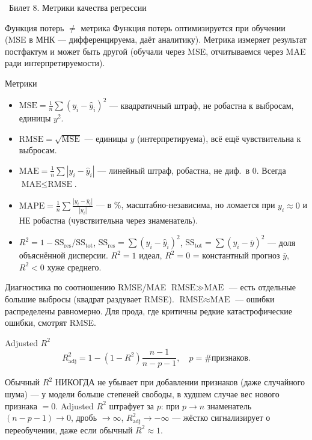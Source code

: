 \documentclass[12pt, a4paper]{article}
\newcommand{\bilet}[2]{%
  \vspace{10pt}%
  \noindent\colorbox{qcolor}{\parbox{\dimexpr\linewidth-2\fboxsep\relax}{%
    \color{white}\large\bfseries\strut\ Билет #1. #2%
  }}%
  \nopagebreak\vspace{5pt}\par\nopagebreak%
}
\newcommand{\wh}[1]{\widehat{#1}}
\begin{document}
\bilet{8}{Метрики качества регрессии}

\begin{rembox}{Функция потерь $\ne$ метрика}
Функция потерь оптимизируется при обучении (MSE в МНК --- дифференцируема, даёт аналитику). Метрика измеряет результат постфактум и может быть другой (обучали через MSE, отчитываемся через MAE ради интерпретируемости).
\end{rembox}

\begin{defbox}{Метрики}
\begin{itemize}
  \item $\text{MSE} = \frac1n\sum(y_i - \wh y_i)^2$ --- квадратичный штраф, не робастна к выбросам, единицы $y^2$.
  \item $\text{RMSE} = \sqrt{\text{MSE}}$ --- единицы $y$ (интерпретируема), всё ещё чувствительна к выбросам.
  \item $\text{MAE} = \frac1n\sum|y_i - \wh y_i|$ --- линейный штраф, робастна, не диф.\ в 0. Всегда $\text{MAE} \le \text{RMSE}$.
  \item $\text{MAPE} = \frac1n\sum \frac{|y_i - \wh y_i|}{|y_i|}$ --- в \%, масштабно-независима, но ломается при $y_i \approx 0$ и НЕ робастна (чувствительна через знаменатель).
  \item $R^2 = 1 - \text{SS}_{\text{res}}/\text{SS}_{\text{tot}}$, $\text{SS}_{\text{res}} = \sum(y_i-\wh y_i)^2$, $\text{SS}_{\text{tot}} = \sum(y_i - \bar y)^2$ --- доля объяснённой дисперсии. $R^2 = 1$ идеал, $R^2 = 0$ = константный прогноз $\bar y$, $R^2 < 0$ хуже среднего.
\end{itemize}
\end{defbox}

\begin{propbox}{Диагностика по соотношению RMSE/MAE}
$\text{RMSE} \gg \text{MAE}$ --- есть отдельные большие выбросы (квадрат раздувает RMSE). $\text{RMSE} \approx \text{MAE}$ --- ошибки распределены равномерно. Для прода, где критичны редкие катастрофические ошибки, смотрят RMSE.
\end{propbox}

\begin{defbox}{Adjusted $R^2$}
\[
  R^2_{\text{adj}} = 1 - (1 - R^2)\frac{n-1}{n-p-1}, \quad p = \text{\# признаков}.
\]
\end{defbox}

\begin{fishkabox}
Обычный $R^2$ НИКОГДА не убывает при добавлении признаков (даже случайного шума) --- у модели больше степеней свободы, в худшем случае вес нового признака $= 0$. Adjusted $R^2$ штрафует за $p$: при $p \to n$ знаменатель $(n-p-1) \to 0$, дробь $\to \infty$, $R^2_{\text{adj}} \to -\infty$ --- жёстко сигнализирует о переобучении, даже если обычный $R^2 \approx 1$.
\end{fishkabox}
\end{document}
